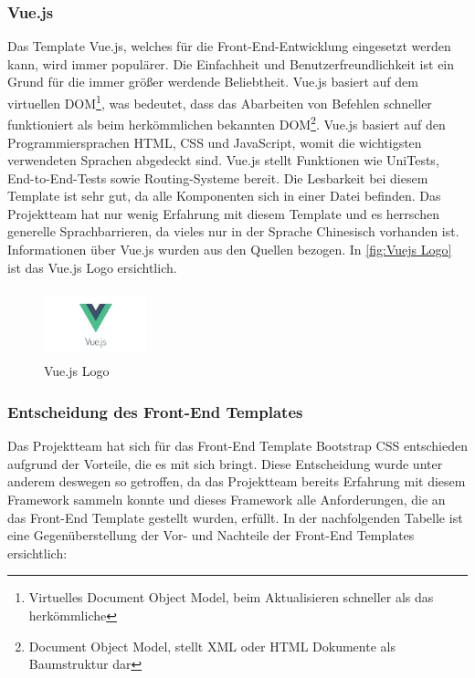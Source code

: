 \subsubsection{Vue.js}\label{sec: Vue.js}
Das Template Vue.js, welches für die Front-End-Entwicklung eingesetzt werden kann, wird immer populärer. Die Einfachheit und Benutzerfreundlichkeit ist ein Grund für die immer größer werdende Beliebtheit. Vue.js basiert auf dem virtuellen DOM\footnote{Virtuelles Document Object Model, beim Aktualisieren schneller als das herkömmliche}, was bedeutet, dass das Abarbeiten von Befehlen schneller funktioniert als beim herkömmlichen bekannten DOM\footnote{Document Object Model, stellt XML oder HTML Dokumente als Baumstruktur dar}. Vue.js basiert auf den Programmiersprachen HTML, CSS und JavaScript, womit die wichtigsten verwendeten Sprachen abgedeckt sind. Vue.js stellt Funktionen wie UniTests, End-to-End-Tests sowie Routing-Systeme bereit. Die Lesbarkeit bei diesem Template ist sehr gut, da alle Komponenten sich in einer Datei befinden. Das Projektteam hat nur wenig Erfahrung mit diesem Template und es herrschen generelle Sprachbarrieren, da vieles nur in der Sprache Chinesisch vorhanden ist. Informationen über Vue.js wurden aus den Quellen \cite{Vuejs1, Vuejs2} bezogen.
 In \autoref{fig:Vuejs Logo}
ist das Vue.js Logo ersichtlich.

\begin{figure}[h]
	\centering
	\includegraphics[height=2cm,width=3cm]{images/vuejs}
	\caption{Vue.js Logo}
	\label{fig:Vuejs Logo}
\end{figure}



\subsubsection{Entscheidung des Front-End Templates}
Das Projektteam hat sich für das Front-End Template Bootstrap CSS entschieden aufgrund der Vorteile, die es mit sich bringt. Diese Entscheidung wurde unter anderem deswegen so getroffen, da das Projektteam bereits Erfahrung mit diesem Framework sammeln konnte und dieses Framework alle Anforderungen, die an das Front-End Template gestellt wurden, erfüllt.
In der nachfolgenden Tabelle ist eine Gegenüberstellung der Vor- und Nachteile der Front-End Templates ersichtlich:

